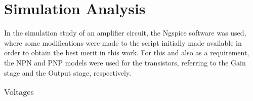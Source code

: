 \section{Simulation Analysis}
\label{sec:simulation} 

In the simulation study of an amplifier circuit, the Ngspice software was used, where some modifications were made to the script initially made available in order to obtain the best merit in this work. For this and also as a requirement, the NPN and PNP models were used for the transistors, referring to the Gain stage and the Output stage, respectively.


\FloatBarrier
\begin{table}[h]
  \centering
  \begin{tabular}{|c|c|c|}
    \hline    
    
    \hline
  \end{tabular}
  \caption{Voltages}
  \label{tab:Spice1}
\end{table}
\FloatBarrier  


